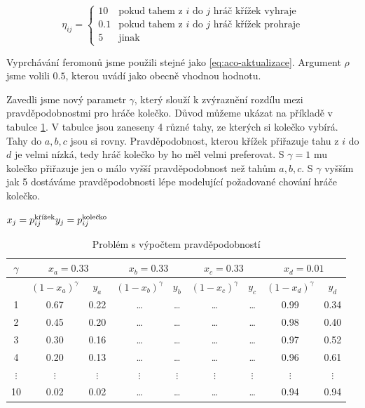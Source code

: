 \documentclass[12pt]{article}
\begin{document}
\begin{equation}
  \eta_{ij} = \begin{cases}
    10		& \text{pokud tahem z $i$ do $j$ hráč křížek vyhraje}
    \\
    0.1    & \text{pokud tahem z $i$ do $j$ hráč křížek prohraje}
    \\
    5       & \text{jinak}
 \end{cases}
\end{equation}

Vyprchávání feromonů jsme použili stejné jako \eqref{eq:aco-aktualizace}. Argument $\rho$ jsme volili $0.5$, kterou uvádí \cite{maniezzo2004} jako obecně vhodnou hodnotu.

Zavedli jsme nový parametr $\gamma$, který slouží k zvýraznění rozdílu mezi pravděpodobnostmi pro hráče kolečko. Důvod můžeme ukázat na příkladě v tabulce \ref{tab:pravdepodobnost-problem}. V tabulce jsou zaneseny 4 různé tahy, ze kterých si kolečko vybírá. Tahy do $a, b, c$ jsou si rovny. Pravděpodobnost, kterou křížek přiřazuje tahu z $i$ do $d$ je velmi nízká, tedy hráč kolečko by ho měl velmi preferovat. S $\gamma = 1$ mu kolečko přiřazuje jen o málo vyšší pravděpodobnost než tahům $a, b, c$. S $\gamma$ vyšším jak 5 dostáváme pravděpodobnosti lépe modelující požadované chování hráče kolečko. 


\begin{table}[hbt]
  \caption{Problém s výpočtem pravděpodobností}
  $x_j = p_{ij}^{\text{křížek}} \\
  y_j = p_{ij}^{\text{kolečko}}$
  \begin{center} 
    \begin{tabular}{ | c | c|c | c|c | c|c | c|c |}
    
      \hline
	  $\gamma$ & \multicolumn{2}{c|}{ $x_a = 0.33$} & \multicolumn{2}{c|}{$x_b = 0.33$} & \multicolumn{2}{c|}{$x_c = 0.33$} & \multicolumn{2}{c|}{$x_d = 0.01$} \\ \hline
	           & $(1 - x_a)^\gamma$ & $y_a$ & $(1 - x_b)^\gamma$ & $ y_b$ & $(1 - x_c)^\gamma$ & $y_c$ & $(1 - x_d)^\gamma$ & $y_d$ \\ \hline
	  
	  1 & 0.67 & 0.22 & \ldots & \ldots  &  \ldots & \ldots   & 0.99 & 0.34 \\ \hline
	  2 & 0.45 & 0.20 & \ldots & \ldots  &  \ldots & \ldots   & 0.98 & 0.40 \\ \hline
	  3 & 0.30 & 0.16 & \ldots & \ldots  &  \ldots & \ldots   & 0.97 & 0.52 \\ \hline
	  4 & 0.20 & 0.13 & \ldots & \ldots  &  \ldots & \ldots   & 0.96 & 0.61 \\ \hline
 $\vdots$ & $\vdots$ & $\vdots$ & $\vdots$ & $\vdots$ & $\vdots$ & $\vdots$ & $\vdots$ & $\vdots$ \\ \hline
     10 & 0.02 & 0.02 & \ldots & \ldots  &  \ldots & \ldots   & 0.94 & 0.94 \\ \hline
	   \end{tabular}
    \label{tab:pravdepodobnost-problem}
  \end{center}
\end{table}
\end{document}

